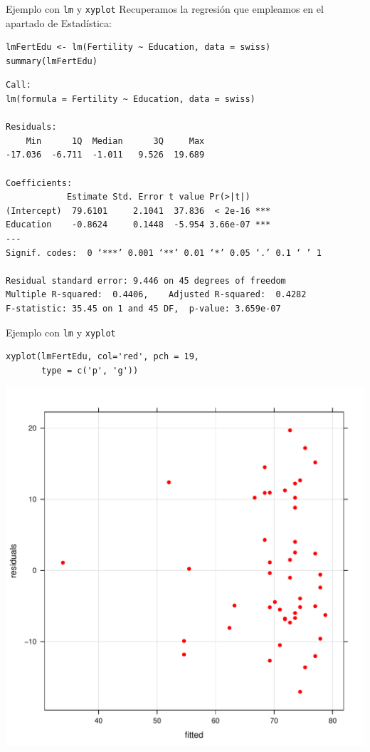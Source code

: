 \documentclass[xcolor={usenames,svgnames,dvipsnames}]{beamer}
\begin{document}
\begin{frame}[fragile,label={sec:orgcbe1ef2}]{Ejemplo con \texttt{lm} y \texttt{xyplot}}
 Recuperamos la regresión que empleamos en el apartado de Estadística:
\lstset{language=r,label= ,caption= ,captionpos=b,numbers=none}
\begin{lstlisting}
lmFertEdu <- lm(Fertility ~ Education, data = swiss)
summary(lmFertEdu)
\end{lstlisting}

\begin{verbatim}
Call:
lm(formula = Fertility ~ Education, data = swiss)

Residuals:
    Min      1Q  Median      3Q     Max 
-17.036  -6.711  -1.011   9.526  19.689 

Coefficients:
            Estimate Std. Error t value Pr(>|t|)    
(Intercept)  79.6101     2.1041  37.836  < 2e-16 ***
Education    -0.8624     0.1448  -5.954 3.66e-07 ***
---
Signif. codes:  0 ‘***’ 0.001 ‘**’ 0.01 ‘*’ 0.05 ‘.’ 0.1 ‘ ’ 1

Residual standard error: 9.446 on 45 degrees of freedom
Multiple R-squared:  0.4406,	Adjusted R-squared:  0.4282 
F-statistic: 35.45 on 1 and 45 DF,  p-value: 3.659e-07
\end{verbatim}
\end{frame}


\begin{frame}[fragile,label={sec:org381a072}]{Ejemplo con \texttt{lm} y \texttt{xyplot}}
 \lstset{language=r,label= ,caption= ,captionpos=b,numbers=none}
\begin{lstlisting}
xyplot(lmFertEdu, col='red', pch = 19,
       type = c('p', 'g'))
\end{lstlisting}
\begin{center}
\includegraphics[height=0.7\textheight]{figs/xyplotS4.pdf}
\end{center}
\end{frame}
\end{document}
